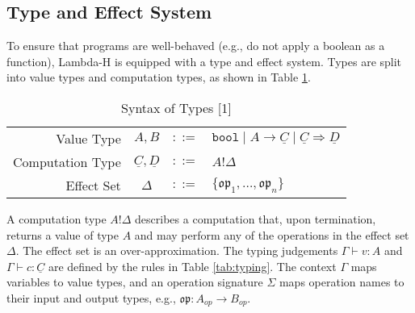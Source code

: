\documentclass{article}
\begin{document}
\subsection{Type and Effect System}
To ensure that programs are well-behaved (e.g., do not apply a boolean as a function), Lambda-H is equipped with a type and effect system. Types are split into value types and computation types, as shown in Table \ref{tab:types}.

\begin{table}[h!]
\centering
\caption{Syntax of Types [1]}
\label{tab:types}
\begin{tabular}{r c l l}
\hline
Value Type & $A, B$ & $::=$ & $\texttt{bool} \mid A \rightarrow \underline{C} \mid \underline{C} \Rightarrow \underline{D}$ \\
Computation Type & $\underline{C}, \underline{D}$ & $::=$ & $A!\Delta$ \\
Effect Set & $\Delta$ & $::=$ & $\{\mathfrak{op}_1, \dots, \mathfrak{op}_n\}$ \\
\hline
\end{tabular}
\end{table}

A computation type $A!\Delta$ describes a computation that, upon termination, returns a value of type $A$ and may perform any of the operations in the effect set $\Delta$. The effect set is an over-approximation. The typing judgements $\Gamma \vdash v: A$ and $\Gamma \vdash c: \underline{C}$ are defined by the rules in Table \ref{tab:typing}. The context $\Gamma$ maps variables to value types, and an operation signature $\Sigma$ maps operation names to their input and output types, e.g., $\mathfrak{op}: A_{op} \rightarrow B_{op}$.
\end{document}

